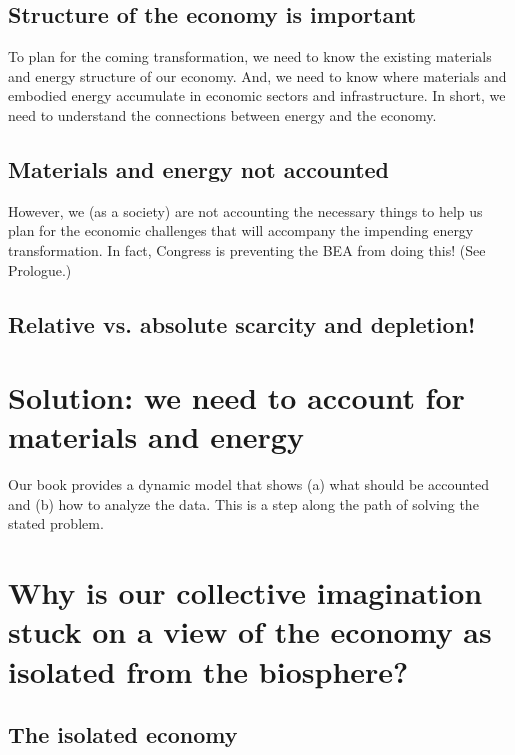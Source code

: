 \subsection{Structure of the economy is important}
\label{sec:structure}

To plan for the coming transformation, we need to know the existing materials and energy structure of our economy. And, we need to know where materials and embodied energy accumulate in economic sectors and infrastructure. In short, we need to understand the connections between energy and the economy.

\subsection{Materials and energy not accounted}
\label{sec:accounting}

However, we (as a society) are not accounting the necessary things to help us plan for the economic challenges that will accompany the impending energy transformation. In fact, Congress is preventing the BEA from doing this! (See Prologue.)


\subsection{Relative vs. absolute scarcity and depletion!}
\label{sec:scarcity}

\section{Solution: we need to account for materials and energy}
\label{sec:solution}

Our book provides a dynamic model that shows (a) what should be accounted and (b) how to analyze the data. This is a step along the path of solving the stated problem.

\section{Why is our collective imagination stuck on a view of the economy as isolated from the biosphere?}
\label{sec:collective_imagination}

\subsection{The isolated economy}
\label{sec:isolated_economy}

